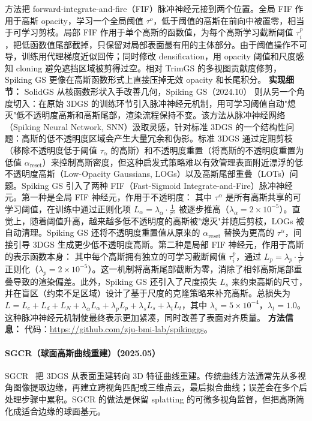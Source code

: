 方法把 forward-integrate-and-fire（FIF）脉冲神经元接到两个位置。全局 FIF 作用于高斯 opacity，学习一个全局阈值 $\tau^o$，低于阈值的高斯在前向中被置零，相当于可学习剪枝。局部 FIF 作用于单个高斯的函数值，为每个高斯学习截断阈值 $\tau_i^p$，把低函数值尾部截掉，只保留对局部表面最有用的主体部分。由于阈值操作不可导，训练用代理梯度近似回传；同时修改 densification，用 opacity 阈值和尺度感知 cloning 避免遮挡区域被剪得过空。相对 TrimGS 的多视图贡献度修剪，Spiking GS 更像在高斯函数形式上直接压掉无效 opacity 和长尾积分。
\textbf{实现细节：} SolidGS 从核函数形状入手改善几何，Spiking GS（2024.10） 则从另一个角度切入：在原始 3DGS 的训练环节引入脉冲神经元机制，用可学习阈值自动"熄灭"低不透明度高斯和高斯尾部，渲染流程保持不变。该方法从脉冲神经网络（Spiking Neural Network, SNN）汲取灵感，针对标准 3DGS 的一个结构性问题：高斯的低不透明度区域会产生大量冗余和伪影。标准 3DGS 通过定期剪枝（移除不透明度低于阈值 $\tau_{\alpha}$ 的高斯）和不透明度重置（将高斯的不透明度重置为低值 $\alpha_{\mathrm{reset}}$）来控制高斯密度，但这种启发式策略难以有效管理表面附近漂浮的低不透明度高斯（Low-Opacity Gaussians, LOGs）以及高斯尾部重叠（LOTs）问题。Spiking GS 引入了两种 FIF（Fast-Sigmoid Integrate-and-Fire）脉冲神经元。第一种是全局 FIF 神经元，作用于不透明度： 其中 $\tau^{\alpha}$ 是所有高斯共享的可学习阈值，在训练中通过正则化项 $L_{\alpha} = \lambda_{\alpha} \cdot \frac{1}{\tau^{\alpha}}$ 被逐步推高（$\lambda_{\alpha} = 2 \times 10^{-5}$）。直觉上，随着阈值升高，越来越多低不透明度的高斯被"熄灭"并随后剪枝，LOGs 被自动清理。Spiking GS 还将不透明度重置值从原来的 $\alpha_{\mathrm{reset}}$ 替换为更高的 $\tau^{\alpha}$，间接引导 3DGS 生成更少低不透明度高斯。第二种是局部 FIF 神经元，作用于高斯的表示函数本身： 其中每个高斯拥有独立的可学习截断阈值 $\tau_i^p$，通过 $L_p = \lambda_p \cdot \frac{1}{\bar{\tau}^p}$ 正则化（$\lambda_p = 2 \times 10^{-5}$）。这一机制将高斯尾部截断为零，消除了相邻高斯尾部重叠导致的渲染偏差。此外，Spiking GS 还引入了尺度损失 $L_s$ 来约束高斯的尺寸，并在盲区（约束不足区域）设计了基于尺度的克隆策略来补充高斯。总损失为 $L = L_c + L_d + L_N + \lambda_{\alpha} L_{\alpha} + \lambda_p L_p + \lambda_s L_s + \lambda_t L_t$，其中 $\lambda_s = 5 \times 10^{-4}$，$\lambda_t = 1.0$。这种脉冲神经元机制使最终表示更加紧凑，同时改善了表面对齐质量。
\textbf{方法信息：} 代码：\url{https://github.com/zju-bmi-lab/spikinggs}。



\paragraph{SGCR（球面高斯曲线重建）（2025.05）}
SGCR~\cite{2505_04668} 把 3DGS 从表面重建转向 3D 特征曲线重建。传统曲线方法通常先从多视角图像提取边缘，再建立跨视角匹配或三维点云，最后拟合曲线；误差会在多个后处理步骤中累积。SGCR 的做法是保留 splatting 的可微多视角监督，但把高斯简化成适合边缘的球面基元。

